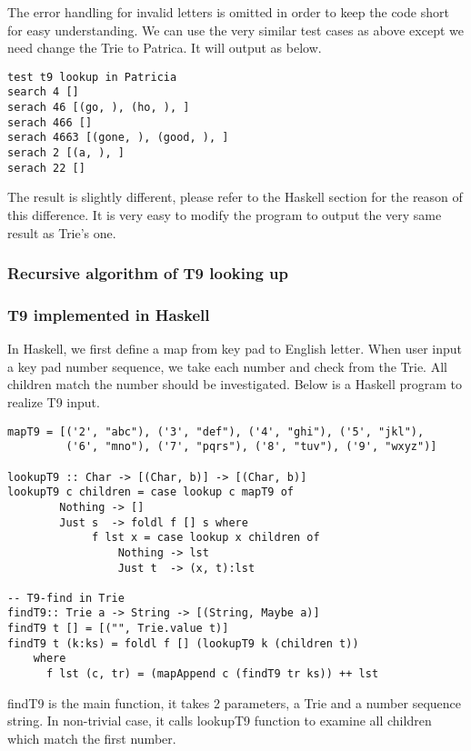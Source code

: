 \documentclass{article}
\begin{document}
The error handling for invalid letters is omitted in order to keep the
code short for easy understanding. We can use the very similar test
cases as above except we need change the Trie to Patrica. It will
output as below.

\begin{verbatim}
test t9 lookup in Patricia
search 4 []
serach 46 [(go, ), (ho, ), ]
serach 466 []
serach 4663 [(gone, ), (good, ), ]
serach 2 [(a, ), ]
serach 22 []
\end{verbatim}

The result is slightly different, please refer to the Haskell section
for the reason of this difference. It is very easy to modify the
program to output the very same result as Trie's one.

\subsubsection{Recursive algorithm of T9 looking up}

\subsubsection*{T9 implemented in Haskell}

In Haskell, we first define a map from key pad to English letter. When user
input a key pad number sequence, we take each number and check from the Trie.
All children match the number should be investigated. Below is a Haskell
program to realize T9 input.

\lstset{language=Haskell}
\begin{lstlisting}
mapT9 = [('2', "abc"), ('3', "def"), ('4', "ghi"), ('5', "jkl"),
         ('6', "mno"), ('7', "pqrs"), ('8', "tuv"), ('9', "wxyz")]

lookupT9 :: Char -> [(Char, b)] -> [(Char, b)]
lookupT9 c children = case lookup c mapT9 of
        Nothing -> []
        Just s  -> foldl f [] s where
             f lst x = case lookup x children of
                 Nothing -> lst
                 Just t  -> (x, t):lst

-- T9-find in Trie
findT9:: Trie a -> String -> [(String, Maybe a)]
findT9 t [] = [("", Trie.value t)]
findT9 t (k:ks) = foldl f [] (lookupT9 k (children t))
    where
      f lst (c, tr) = (mapAppend c (findT9 tr ks)) ++ lst
\end{lstlisting}

findT9 is the main function, it takes 2 parameters, a Trie and a number
sequence string. In non-trivial case, it calls lookupT9 function to
examine all children which match the first number.
\end{document}
